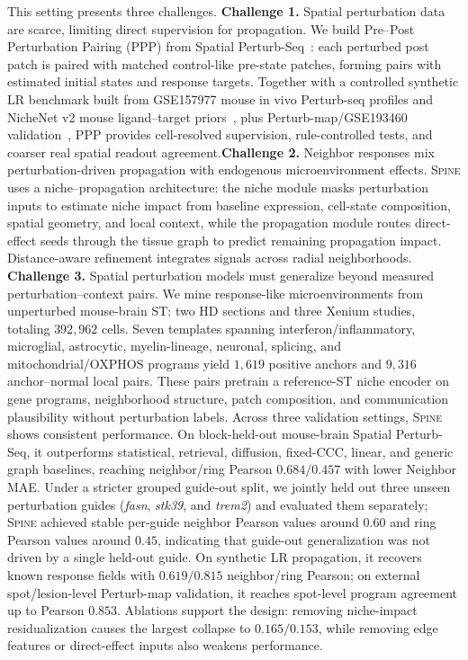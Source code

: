 \documentclass[sigconf,review,balance=false]{acmart}
\newcommand{\methodname}{\textsc{Spine}\xspace}
\begin{document}
This setting presents three challenges. \textbf{Challenge 1.} Spatial perturbation data are scarce, limiting direct supervision for propagation. We build Pre--Post Perturbation Pairing (PPP) from Spatial Perturb-Seq~\cite{shen2026spatialperturbseq}: each perturbed post patch is paired with matched control-like pre-state patches, forming pairs with estimated initial states and response targets. Together with a controlled synthetic LR benchmark built from GSE157977 mouse in vivo Perturb-seq profiles and NicheNet v2 mouse ligand--target priors~\citep{jin2020invivo,browaeys2020nichenet,browaeys2022nichenetv2}, plus Perturb-map/GSE193460 validation~\citep{dhainaut2022spatialcrispr}, PPP provides cell-resolved supervision, rule-controlled tests, and coarser real spatial readout agreement.\textbf{Challenge 2.} Neighbor responses mix perturbation-driven propagation with endogenous microenvironment effects. \methodname{} uses a niche--propagation architecture: the niche module masks perturbation inputs to estimate niche impact from baseline expression, cell-state composition, spatial geometry, and local context, while the propagation module routes direct-effect seeds through the tissue graph to predict remaining propagation impact. Distance-aware refinement integrates signals across radial neighborhoods. \textbf{Challenge 3.} Spatial perturbation models must generalize beyond measured perturbation--context pairs. We mine response-like microenvironments from unperturbed mouse-brain ST: two HD sections and three Xenium studies, totaling $392{,}962$ cells. Seven templates spanning interferon/inflammatory, microglial, astrocytic, myelin-lineage, neuronal, splicing, and mitochondrial/OXPHOS programs yield $1{,}619$ positive anchors and $9{,}316$ anchor--normal local pairs. These pairs pretrain a reference-ST niche encoder on gene programs, neighborhood structure, patch composition, and communication plausibility without perturbation labels.
Across three validation settings, \methodname{} shows consistent performance. On block-held-out mouse-brain Spatial Perturb-Seq, it outperforms statistical, retrieval, diffusion, fixed-CCC, linear, and generic graph baselines, reaching neighbor/ring Pearson $0.684/0.457$ with lower Neighbor MAE. Under a stricter grouped guide-out split, we jointly held out three unseen perturbation guides (\textit{fasn}, \textit{stk39}, and \textit{trem2}) and evaluated them separately; \methodname{} achieved stable per-guide neighbor Pearson values around $0.60$ and ring Pearson values around $0.45$, indicating that guide-out generalization was not driven by a single held-out guide. On synthetic LR propagation, it recovers known response fields with $0.619/0.815$ neighbor/ring Pearson; on external spot/lesion-level Perturb-map validation, it reaches spot-level program agreement up to Pearson $0.853$. Ablations support the design: removing niche-impact residualization causes the largest collapse to $0.165/0.153$, while removing edge features or direct-effect inputs also weakens performance.
\end{document}
